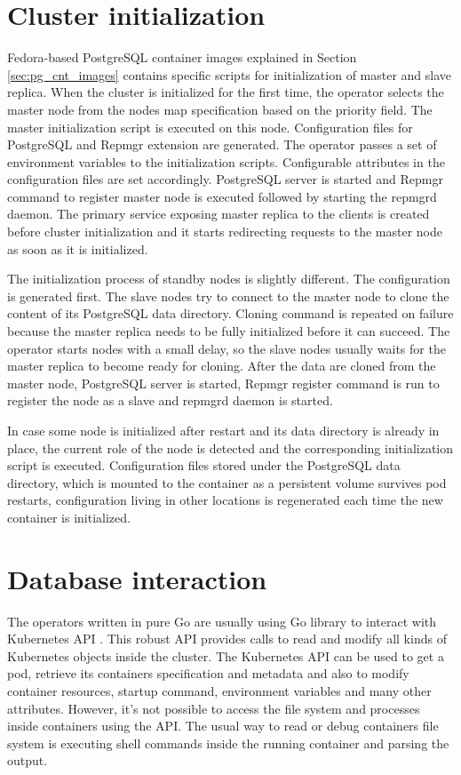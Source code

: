 \documentclass[
  digital, %
  twoside, %
  table,   %
  lof,     %
  lot,     %
]{fithesis3}
\begin{document}
\section{Cluster initialization}
Fedora-based PostgreSQL container images explained in Section \ref{sec:pg_cnt_images} contains specific scripts for initialization of master and slave replica. When the cluster is initialized for the first time, the operator selects the master node from the nodes map specification based on the priority field. The master initialization script is executed on this node. Configuration files for PostgreSQL and Repmgr extension are generated. The operator passes a set of environment variables to the initialization scripts. Configurable attributes in the configuration files are set accordingly. PostgreSQL server is started and Repmgr command to register master node is executed followed by starting the repmgrd daemon. The primary service exposing master replica to the clients is created before cluster initialization and it starts redirecting requests to the master node as soon as it is initialized.

The initialization process of standby nodes is slightly different. The configuration is generated first. The slave nodes try to connect to the master node to clone the content of its PostgreSQL data directory. Cloning command is repeated on failure because the master replica needs to be fully initialized before it can succeed. The operator starts nodes with a small delay, so the slave nodes usually waits for the master replica to become ready for cloning. After the data are cloned from the master node, PostgreSQL server is started, Repmgr register command is run to register the node as a slave and repmgrd daemon is started.

In case some node is initialized after restart and its data directory is already in place, the current role of the node is detected and the corresponding initialization script is executed. Configuration files stored under the PostgreSQL data directory, which is mounted to the container as a persistent volume survives pod restarts, configuration living in other locations is regenerated each time the new container is initialized.

\section{Database interaction}
The operators written in pure Go are usually using Go library to interact with Kubernetes API \cite{k8s-api}. This robust API provides calls to read and modify all kinds of Kubernetes objects inside the cluster. The Kubernetes API can be used to get a pod, retrieve its containers specification and metadata and also to modify container resources, startup command, environment variables and many other attributes. However, it’s not possible to access the file system and processes inside containers using the API. The usual way to read or debug containers file system is executing shell commands inside the running container and parsing the output.
\end{document}
